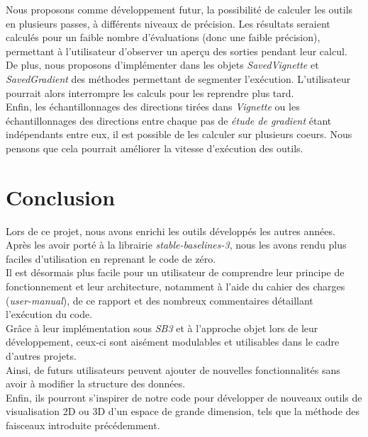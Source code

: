 \documentclass[12pt]{article}
\begin{document}
Nous proposons comme développement futur, la possibilité de calculer les outils en plusieurs passes, à différents niveaux de précision. Les résultats seraient calculés pour un faible nombre d'évaluations (donc une faible précision), permettant à l'utilisateur d'observer un aperçu des sorties pendant leur calcul. \\

De plus, nous proposons d'implémenter dans les objets \emph{SavedVignette} et \emph{SavedGradient} des méthodes permettant de segmenter l'exécution. L'utilisateur pourrait alors interrompre les calculs pour les reprendre plus tard. \\

Enfin, les échantillonnages des directions tirées dans \emph{Vignette} ou les échantillonnages des directions entre chaque pas de \emph{étude de gradient} étant indépendants entre eux, il est possible de les calculer sur plusieurs coeurs. Nous pensons que cela pourrait améliorer la vitesse d'exécution des outils. \\

\section*{Conclusion}

Lors de ce projet, nous avons enrichi les outils développés les autres années. Après les avoir porté à la librairie \emph{stable-baselines-3}, nous les avons rendu plus faciles d'utilisation en reprenant le code de zéro. \\

Il est désormais plus facile pour un utilisateur de comprendre leur principe de fonctionnement et leur architecture, notamment à l'aide du cahier des charges (\emph{user-manual}), de ce rapport et des nombreux commentaires détaillant l'exécution du code. \\

Grâce à leur implémentation sous \emph{SB3} et à l'approche objet lors de leur développement, ceux-ci sont aisément modulables et utilisables dans le cadre d'autres projets. \\

Ainsi, de futurs utilisateurs peuvent ajouter de nouvelles fonctionnalités sans avoir à modifier la structure des données. \\

Enfin, ils pourront s'inspirer de notre code pour développer de nouveaux outils de visualisation 2D ou 3D d'un espace de grande dimension, tels que la méthode des faisceaux introduite précédemment. \\
\end{document}
